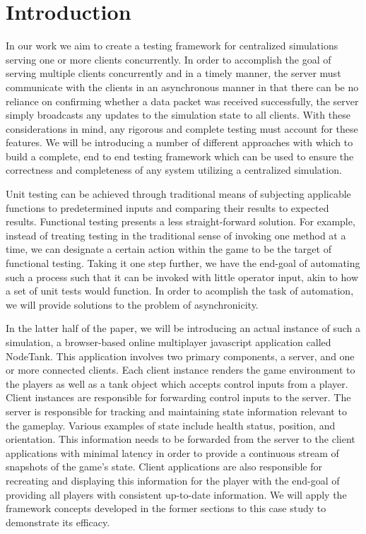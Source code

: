 \documentclass[conference]{IEEEtran}
\begin{document}
\section{Introduction}
In our work we aim to create a testing framework for centralized simulations serving one or more clients concurrently. In order to accomplish the goal of serving
multiple clients concurrently and in a timely manner, the server must communicate with the clients in an asynchronous manner in that there can be no reliance 
on confirming whether a data packet was received successfully, the server simply broadcasts any updates to the simulation state to all clients. With these considerations
in mind, any rigorous and complete testing must account for these features. We will be introducing a number of different approaches with which to build a complete, end to end
testing framework which can be used to ensure the correctness and completeness of any system utilizing a centralized simulation.

Unit testing can be achieved through traditional means of subjecting applicable functions to predetermined inputs and comparing their results to expected results. 
Functional testing presents a less straight-forward solution. For example, instead of treating testing in the traditional sense of invoking one method at a time,
we can designate a certain action within the game to be the target of functional testing. Taking it one step further, we have the end-goal of automating such a process such that 
it can be invoked with little operator input, akin to how a set of unit tests would function. In order to acomplish the task of automation, we will provide solutions to the problem
of asynchronicity.

In the latter half of the paper, we will be introducing an actual instance of such a simulation, a browser-based online multiplayer javascript application called NodeTank. 
This application involves two primary components, a server, and one or more connected clients. Each client instance renders the game environment to the players as well as a tank object which accepts control inputs from 
a player. Client instances are responsible for forwarding control inputs to the server. The server is responsible for tracking and maintaining state information relevant 
to the gameplay. Various examples of state include health status, position, and orientation. This information needs to be forwarded from the server to the client applications 
with minimal latency in order to provide a continuous stream of snapshots of the game’s state. Client applications are also responsible for recreating and displaying this 
information for the player with the end-goal of providing all players with consistent up-to-date information. We will apply the framework concepts developed in the former sections to this 
case study to demonstrate its efficacy.
\end{document}
